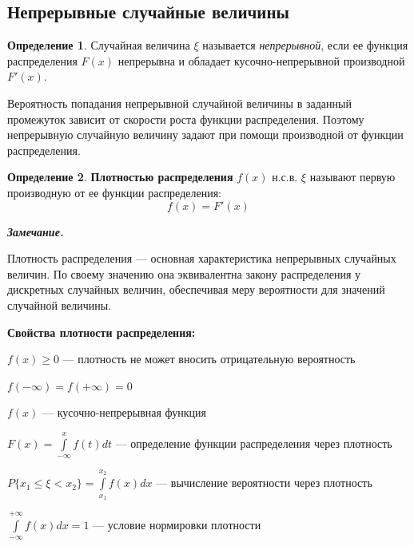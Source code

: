 \documentclass[12pt,a4paper]{article}
\newcommand{\deglistwithtitle}[2]{%
    \noindent\textbf{#1}\par\vspace{0.3em}
    \begin{deglist}
        #2
    \end{deglist}
}
\theoremstyle{definition}
\newtheorem{definition}{Определение}[section]
\theoremstyle{definition}
\theoremstyle{remark}
\newenvironment{remark}{
  \par\noindent\textbf{\textit{Замечание.}}~
}{\par}
\theoremstyle{corollary}
\newcommand{\nextblock}{\vspace{1.5em}\noindent}
\theoremstyle{bolditalic}
\begin{document}
\subsection{Непрерывные случайные величины}

\begin{definition}
    Случайная величина $\xi$ называется \textit{непрерывной}, если ее функция распределения $F(x)$ непрерывна и обладает кусочно-непрерывной производной $F'(x)$.
\end{definition}

Вероятность попадания непрерывной случайной величины в заданный промежуток зависит от скорости роста функции распределения. Поэтому непрерывную случайную величину задают при помощи производной от функции распределения. 

\begin{definition}
    \textbf{Плотностью распределения} $f(x)$ н.с.в. $\xi$ называют первую производную от ее функции распределения:
    \[
    f(x) = F'(x)
    \]
\end{definition}

\begin{remark}
    Плотность распределения --- основная характеристика непрерывных случайных величин. По своему значению она эквивалентна закону распределения у дискретных случайных величин, обеспечивая меру вероятности для значений случайной величины. 
\end{remark}

\nextblock

\deglistwithtitle{Свойства плотности распределения:}{
    \item $f(x) \ge 0$ --- плотность не может вносить отрицательную вероятность
    \item $f(-\infty)=f(+\infty)=0$
    \item $f(x)$ --- кусочно-непрерывная функция
    \item $F(x) = \int\limits_{-\infty}^{x}{f(t)dt}$ --- определение функции распределения через плотность
    \item $P\{x_1 \le \xi < x_2\}=\int\limits_{x_1}^{x_2}{f(x)dx}$ --- вычисление вероятности через плотность
    \item $\int\limits_{-\infty}^{+\infty}{f(x)dx} = 1$ --- условие нормировки плотности
}

\nextblock
\end{document}
